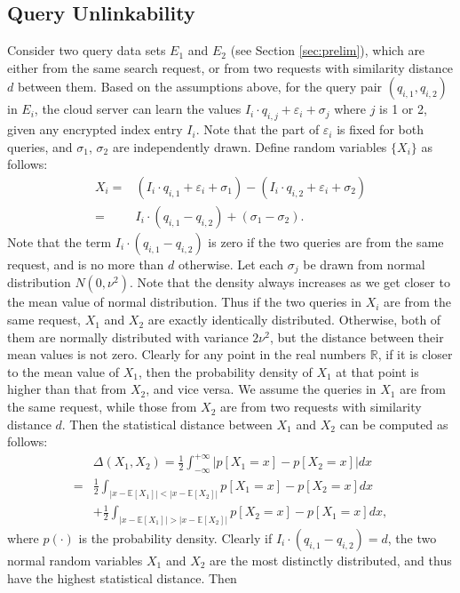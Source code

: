 \documentclass{article}
\begin{document}
\subsection{Query Unlinkability}
Consider two query data sets $E_1$ and $E_2$ (see Section \ref{sec:prelim}), which are either from the same search request, or from two requests with similarity distance $d$ between them. Based on the assumptions above, for the query pair $(q_{i,1},q_{i,2})$ in $E_i$, the cloud server can learn the values $I_i\cdot q_{i,j}+\varepsilon_i+\sigma_j$ where $j$ is 1 or 2, given any encrypted index entry $I_i$. Note that the part of $\varepsilon_i$ is fixed for both queries, and $\sigma_1$, $\sigma_2$ are independently drawn. Define random variables $\{X_i\}$ as follows:
$$
\begin{aligned}
X_i = &(I_i\cdot q_{i,1}+\varepsilon_i+\sigma_1) - (I_i\cdot q_{i,2}+\varepsilon_i+\sigma_2)\\
=&I_i\cdot(q_{i,1}-q_{i,2})+(\sigma_1-\sigma_2).
\end{aligned}
$$
Note that the term $I_i\cdot(q_{i,1}-q_{i,2})$ is zero if the two queries are from the same request, and is no more than $d$ otherwise. Let each $\sigma_j$ be drawn from normal distribution $N(0,\nu^2)$. Note that the density always increases as we get closer to the mean value of normal distribution. Thus if the two queries in $X_i$ are from the same request, $X_1$ and $X_2$ are exactly identically distributed. Otherwise, both of them are normally distributed with variance $2\nu^2$, but the distance between their mean values is not zero. Clearly for any point in the real numbers $\mathbb{R}$, if it is closer to the mean value of $X_1$, then the probability density of $X_1$ at that point is higher than that from $X_2$, and vice versa. We assume the queries in $X_1$ are from the same request, while those from $X_2$ are from two requests with similarity distance $d$. Then the statistical distance between $X_1$ and $X_2$ can be computed as follows:
\newcommand{\norm}[1]{| #1 |}
$$\begin{aligned}
&\Delta(X_1, X_2) 
= \frac{1}{2}\int_{-\infty}^{+\infty} \bigg| p[X_1=x] - p[X_2=x] \bigg| dx\\
=& \frac{1}{2}\int_{\norm{x-\mathbb{E}[X_1]} < \norm{x-\mathbb{E}[X_2]}} p[X_1=x] - p[X_2=x]dx \\
&+\frac{1}{2}\int_{\norm{x-\mathbb{E}[X_1]} > \norm{x-\mathbb{E}[X_2]}} p[X_2=x] - p[X_1=x]dx,
\end{aligned}$$
where $p(\cdot)$ is the probability density. 
Clearly if $I_i\cdot(q_{i,1}-q_{i,2})=d$, the two normal random variables $X_1$ and $X_2$ are the most distinctly distributed, and thus have the highest statistical distance. Then
\end{document}
